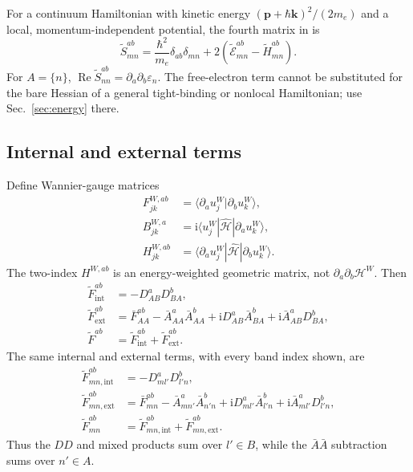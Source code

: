 \documentclass[prx,amsmath,amssymb,superscriptaddress,longbibliography]{revtex4-2}
\newcommand{\Rea}{\operatorname{Re}}
\newcommand{\ii}{\mathrm{i}}
\newcommand{\code}[1]{\texttt{\detokenize{#1}}}
\begin{document}
For a continuum Hamiltonian with kinetic energy $(\bm p+\hbar\bm k)^2/(2m_e)$
and a local, momentum-independent potential, the fourth matrix in
\code{Wannier.tex} is
\begin{equation}
 \widetilde S_{mn}^{ab}=\frac{\hbar^2}{m_e}\delta_{ab}\delta_{mn}
                  +2(\widetilde{\mathcal E}_{mn}^{ab}-\widetilde H_{mn}^{ab}).
 \label{eq:S-continuum}
\end{equation}
For $A=\{n\}$, $\Rea\widetilde S_{nn}^{ab}=\partial_a\partial_b\varepsilon_n$.
The free-electron term cannot be substituted for the bare Hessian of a
general tight-binding or nonlocal Hamiltonian; use Sec.~\ref{sec:energy} there.

\subsection{Internal and external terms}
Define Wannier-gauge matrices
\begin{align}
 F_{jk}^{W,ab}&=\langle\partial_a u_j^W|\partial_b u_k^W\rangle,\nonumber\\
 B_{jk}^{W,a}&=\ii\langle u_j^W|\hat{\mathcal H}|\partial_a u_k^W\rangle,\nonumber\\
 H_{jk}^{W,ab}&=\langle\partial_a u_j^W|\hat{\mathcal H}|\partial_b u_k^W\rangle.
 \label{eq:external-data}
\end{align}
The two-index $H^{W,ab}$ is an energy-weighted geometric matrix,
not $\partial_a\partial_b\mathcal H^W$.
Then
\begin{align}
 \widetilde F^{ab}_{\mathrm{int}}
 &=-D_{AB}^aD_{BA}^b,\label{eq:Fint}\\
 \widetilde F^{ab}_{\mathrm{ext}}
 &=\bar F_{AA}^{ab}-\bar A_{AA}^a\bar A_{AA}^b
    +\ii D_{AB}^a\bar A_{BA}^b+\ii\bar A_{AB}^a D_{BA}^b,\label{eq:Fext}\\
 \widetilde F^{ab}&=\widetilde F^{ab}_{\mathrm{int}}+
                    \widetilde F^{ab}_{\mathrm{ext}}.
\end{align}
The same internal and external terms, with every band index shown, are
\begin{align}
 \widetilde F_{mn,\mathrm{int}}^{ab}
 &=-D_{ml'}^aD_{l'n}^b,\nonumber\\
 \widetilde F_{mn,\mathrm{ext}}^{ab}
 &=\bar F_{mn}^{ab}-\bar A_{mn'}^a\bar A_{n'n}^b
 +\ii D_{ml'}^a\bar A_{l'n}^b+\ii\bar A_{ml'}^aD_{l'n}^b,\nonumber\\
 \widetilde F_{mn}^{ab}&=\widetilde F_{mn,\mathrm{int}}^{ab}
                         +\widetilde F_{mn,\mathrm{ext}}^{ab}.
 \label{eq:Finterpolation-components}
\end{align}
Thus the $DD$ and mixed products sum over $l'\in B$, while the
$\bar A\bar A$ subtraction sums over $n'\in A$.
\end{document}
